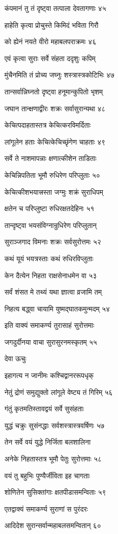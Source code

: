 कंपमानं तु तं दृष्ट्वा तत्पाला देवतागणाः ४५

हाहेति कृत्वा प्रोचुस्ते किमिदं भविता गिरौ

को ह्येनं नयते वीरो महाबलपराक्रमः ४६

एवं कृत्वा सुराः सर्वे संहता ददृशुः कपिम्

मुंचैनमिति तं प्रोच्य जघ्नुः शस्त्रास्त्रकोटिभिः ४७

तान्सर्वान्निघ्नतो दृष्ट्वा हनूमान्कुपितो भृशम्

जघान तान्क्षणाद्वीरः शक्रः सर्वासुरान्यथा ४८

केचित्पदाहतास्तत्र केचित्करविमर्दिताः

लांगूलेन हताः केचित्केचिच्छृंगेण चाहताः ४९

सर्वे ते नाशमापन्नाः क्षणात्कीशेन ताडिताः

केचिन्निपतिता भूमौ रुधिरेण परिप्लुताः ५०

केचित्कीशभयात्त्रस्ता जग्मुः शक्रं सुराधिपम्

क्षतेन च परिप्लुष्टा रुधिरक्षतदेहिनः ५१

तान्दृष्ट्वा भयसंविग्नान्रुधिरेण परिप्लुतान्

सुराञ्जगाद विमनाः शक्रः सर्वसुरोत्तमः ५२

कथं यूयं भयत्रस्ताः कथं रुधिरविप्लुताः

केन दैत्येन निहता राक्षसेनाधमेन वा ५३

सर्वं शंसत मे तथ्यं यथा ज्ञात्वा व्रजामि तम्

निहत्य बद्ध्वा चायामि युष्मद्घातकमुन्मदम् ५४

इति वाक्यं समाकर्ण्य तुरासाहं सुरोत्तमाः

जगदुर्दीनया वाचा सुरासुरनमस्कृतम् ५५

देवा ऊचुः

इहागत्य न जानीमः कश्चिद्वानररूपधृक्

नेतुं द्रोणं समुद्युक्तो लांगूले वेष्ट्य तं गिरिम् ५६

गंतुं कृतमतिस्तावद्वयं सर्वे सुसंहताः

युद्धं चक्रुः सुसंनद्धाः सर्वशस्त्रास्त्रवर्षिणः ५७

तेन सर्वे वयं युद्धे निर्जिता बलशालिना

अनेके निहतास्तत्र भूमौ पेतुः सुरोत्तमाः ५८

वयं तु बहुभिः पुण्यैर्जीविता इह चागताः

शोणितेन सुसिक्तांगाः क्षतपीडासमन्विताः ५९

एतद्वाक्यं समाकर्ण्य सुराणां स पुरंदरः

आदिदेश सुरान्सर्वान्महाबलसमन्वितान् ६०

